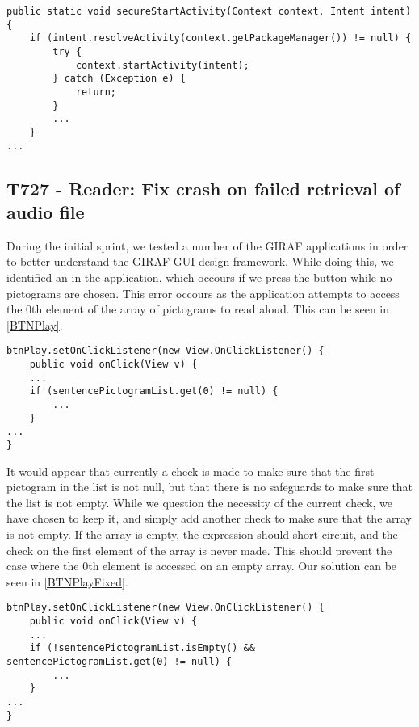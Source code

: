 \begin{minipage}[H]{\linewidth}
\begin{lstlisting}[caption = New approach to launching applications., label = NewLaunch] 
public static void secureStartActivity(Context context, Intent intent) {
	if (intent.resolveActivity(context.getPackageManager()) != null) {
    	try {
        	context.startActivity(intent);
        } catch (Exception e) {
        	return;
        }
        ...
    }
...
\end{lstlisting}
\end{minipage}



\subsection{T727 - Reader: Fix crash on failed retrieval of audio file}
During the initial sprint, we tested a number of the GIRAF applications in order
to better understand the GIRAF GUI design framework. While doing this, we
identified an  in the 
application, which occours if we press the  button while no
pictograms are chosen. This error occours as the application attempts to access
the 0th element of the array of pictograms to read aloud. This can be seen in
\autoref{BTNPlay}.\nl

\begin{minipage}[H]{\linewidth}
\begin{lstlisting}[caption = Accessing the 0th element of a null array., label = BTNPlay] 
btnPlay.setOnClickListener(new View.OnClickListener() {
	public void onClick(View v) {
	...
	if (sentencePictogramList.get(0) != null) {
		...
	}
...
}
\end{lstlisting}
\end{minipage}

It would appear that currently a check is made to make sure that the first
pictogram in the list is not null, but that there is no safeguards to make sure
that the list is not empty. While we question the necessity of the current
check, we have chosen to keep it, and simply add another check to make sure that
the array is not empty. If the array is empty, the expression should short
circuit, and the check on the first element of the array is never made. This
should prevent the case where the 0th element is accessed on an empty array. Our
solution can be seen in \autoref{BTNPlayFixed}.\nl

\begin{minipage}[H]{\linewidth}
\begin{lstlisting}[caption = Our solution to the presented problem., label = BTNPlayFixed] 
btnPlay.setOnClickListener(new View.OnClickListener() {
	public void onClick(View v) {
	...
	if (!sentencePictogramList.isEmpty() && sentencePictogramList.get(0) != null) {
		...
	}
...
}
\end{lstlisting}
\end{minipage}

